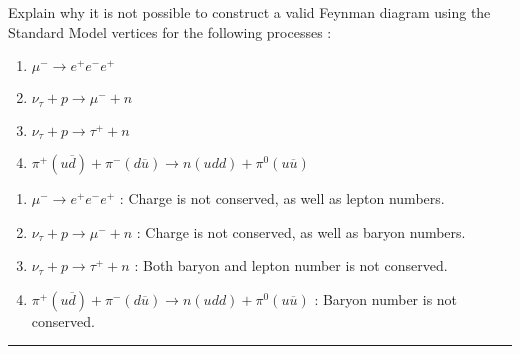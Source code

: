 \begin{problem}{1.3}
Explain why it is not possible to construct a valid Feynman diagram using the Standard Model vertices for the following processes :
\begin{enumerate}[label=(\alph*)]
    \item $\mu^- \to e^+e^-e^+$
    \item $\nu_\tau + p \to \mu^- + n$
    \item $\nu_\tau + p \to \tau^+ + n$
    \item $\pi^+(u\overbar{d})+\pi^-(d\overbar{u}) \to n(udd) + \pi^0(u\overbar{u})$
\end{enumerate}
\end{problem}
\begin{solution}
\begin{enumerate}[label=(\alph*)]
    \item $\mu^- \to e^+e^-e^+$ : Charge is not conserved, as well as lepton numbers.
    \item $\nu_\tau + p \to \mu^- + n$ : Charge is not conserved, as well as baryon numbers.
    \item $\nu_\tau + p \to \tau^+ + n$ : Both baryon and lepton number is not conserved.
    \item $\pi^+(u\overbar{d})+\pi^-(d\overbar{u}) \to n(udd) + \pi^0(u\overbar{u})$ : Baryon number is not conserved.
\end{enumerate}
\end{solution}

\noindent\rule{7in}{1.5pt}


